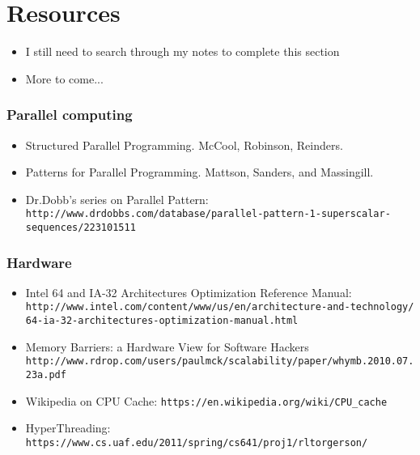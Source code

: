 \section{Resources}
\label{sec:res}

\begin{frame}
  \begin{itemize}
  \item I still need to search through my notes to complete this section
  \item More to come...
  \end{itemize}
\end{frame}

\begin{frame}[fragile]
  \frametitle{Parallel computing}

  \begin{itemize}
  \item Structured Parallel Programming. McCool, Robinson, Reinders.
  \item Patterns for Parallel Programming. Mattson, Sanders, and Massingill.
  \item Dr.Dobb's series on Parallel Pattern: \tiny\verb+http://www.drdobbs.com/database/parallel-pattern-1-superscalar-sequences/223101511+
  \end{itemize}
\end{frame}

\begin{frame}[fragile]
  \frametitle{Hardware}

  \begin{itemize}
  \item Intel 64 and IA-32 Architectures Optimization Reference Manual: \tiny\verb+http://www.intel.com/content/www/us/en/architecture-and-technology/+
    \tiny\verb+64-ia-32-architectures-optimization-manual.html+
  \item \small Memory Barriers: a Hardware View for Software Hackers
    \tiny\verb+http://www.rdrop.com/users/paulmck/scalability/paper/whymb.2010.07.23a.pdf+
  \item \small Wikipedia on CPU Cache: \verb+https://en.wikipedia.org/wiki/CPU_cache+
  \item \small HyperThreading: \tiny\verb+https://www.cs.uaf.edu/2011/spring/cs641/proj1/rltorgerson/+
  \end{itemize}
\end{frame}

